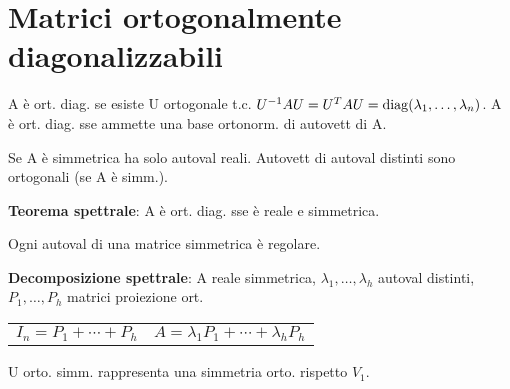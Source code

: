 \section{Matrici ortogonalmente diagonalizzabili}

A è ort. diag. se esiste U ortogonale t.c. $U^{-1}AU = U^TAU = \mathrm{diag}(\lambda_1, \dots, \lambda_n)$.
A è ort. diag. sse ammette una base ortonorm. di autovett di A.

Se A è simmetrica ha solo autoval reali. Autovett di autoval distinti sono ortogonali (se A è simm.).

\textbf{Teorema spettrale}: A è ort. diag. sse è reale e simmetrica.

Ogni autoval di una matrice simmetrica è regolare.

\textbf{Decomposizione spettrale}: A reale simmetrica, $\lambda_1, \dots, \lambda_h$ autoval distinti, $P_1, \dots, P_h$ matrici proiezione ort.
\begin{tabular}{ll}
	$I_n = P_1 + \cdots + P_h$ & $A = \lambda_1P_1 + \cdots + \lambda_hP_h$
\end{tabular}

U orto. simm. rappresenta una simmetria orto. rispetto $V_1$.
